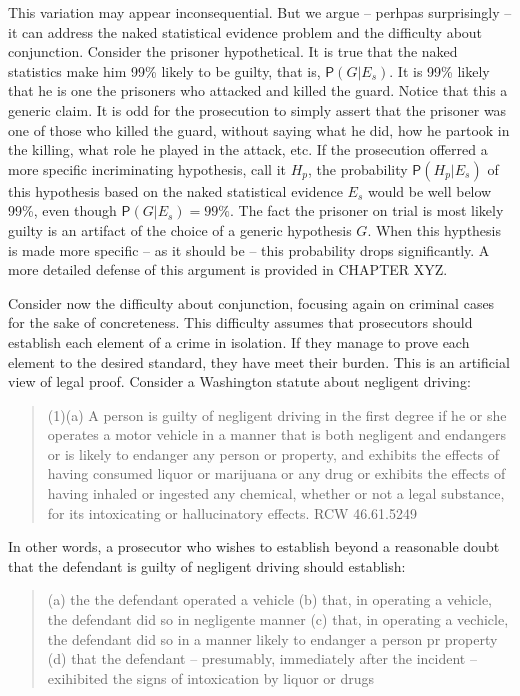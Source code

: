 \documentclass[10pt,dvipsnames,enabledeprecatedfontcommands]{scrartcl}
\newcommand{\pr}[1]{\mathsf{P}(#1)}
\begin{document}
This variation may appear inconsequential. But we argue -- perhpas
surprisingly -- it can address the naked statistical evidence problem
and the difficulty about conjunction. Consider the prisoner
hypothetical. It is true that the naked statistics make him 99\% likely
to be guilty, that is, \(\pr{G | E_s}\). It is 99\% likely that he is
one the prisoners who attacked and killed the guard. Notice that this a
generic claim. It is odd for the prosecution to simply assert that the
prisoner was one of those who killed the guard, without saying what he
did, how he partook in the killing, what role he played in the attack,
etc. If the prosecution offerred a more specific incriminating
hypothesis, call it \(H_p\), the probability \(\pr{H_p | E_{s}}\) of
this hypothesis based on the naked statistical evidence \(E_s\) would be
well below 99\%, even though \(\pr{G | E_s}=99\%\). The fact the
prisoner on trial is most likely guilty is an artifact of the choice of
a generic hypothesis \(G\). When this hypthesis is made more specific --
as it should be -- this probability drops significantly. A more detailed
defense of this argument is provided in CHAPTER XYZ.

Consider now the difficulty about conjunction, focusing again on
criminal cases for the sake of concreteness. This difficulty assumes
that prosecutors should establish each element of a crime in isolation.
If they manage to prove each element to the desired standard, they have
meet their burden. This is an artificial view of legal proof. Consider a
Washington statute about negligent driving:

\begin{quote}
(1)(a) A person is guilty of negligent driving in the first degree if he or she operates a motor vehicle in a manner that is both negligent and endangers or is likely to endanger any person or property, and exhibits the effects of having consumed liquor or marijuana or any drug or exhibits the effects of having inhaled or ingested any chemical, whether or not a legal substance, for its intoxicating or hallucinatory effects. RCW 46.61.5249
\end{quote}

\noindent
In other words, a prosecutor who wishes to establish beyond a reasonable
doubt that the defendant is guilty of negligent driving should
establish:

\begin{quote}
(a) the the defendant operated a vehicle
(b) that, in operating a vehicle, the defendant did so in  negligente manner
(c) that, in operating a vechicle, the defendant did so in a manner likely to endanger a person pr property
(d) that the defendant -- presumably, immediately after the incident -- exihibited the signs of intoxication by liquor or drugs
\end{quote}
\end{document}
